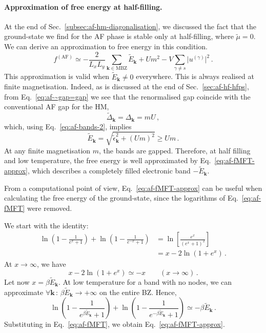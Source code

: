 \paragraph{Approximation of free energy at half-filling.}

At the end of Sec.~\ref{subsec:af-hm-diagonalisation}, we discussed the fact that the ground-state we find for the AF phase is stable only at half-filling, where $\tilde{\mu}=0$. We can derive an approximation to free energy in this condition.
\begin{equation}\label{eq:af-fMFT-approx}
	f^{(\mathrm{AF})} \simeq -\frac{2}{L_x L_y} \sum_{\mathbf{k}\in\mathrm{MBZ}} \tilde{E}_\mathbf{k} + U m^2 - V \sum_{\gamma \neq s} \big|u^{(\gamma)}\big|^2 \, .
\end{equation}
This approximation is valid when $\tilde{E}_\mathbf{k} \neq 0$ everywhere. This is always realised at finite magnetisation. Indeed, as is discussed at the end of Sec.~\ref{sec:af-hf-hfps}, from Eq.~\eqref{eq:af-~gap=gap} we see that the renormalised gap coincide with the conventional AF gap for the HM,
\[
	\tilde{\Delta}_\mathbf{k} = \Delta_\mathbf{k} = mU \, ,
\]
which, using Eq.~\eqref{eq:af-bands-2}, implies
\begin{equation}\label{eq:af-Ek>Um}
	\tilde{E}_\mathbf{k} = \sqrt{\tilde{\epsilon}_\mathbf{k}^2 + (Um)^2} \ge Um \, .
\end{equation}
At any finite magnetisation $m$, the bands are gapped. Therefore, at half filling and low temperature, the free energy is well approximated by Eq.~\eqref{eq:af-fMFT-approx}, which describes a completely filled electronic band $-\tilde{E}_\mathbf{k}$.

From a computational point of view, Eq.~\eqref{eq:af-fMFT-approx} can be useful when calculating the free energy of the ground-state, since the logarithms of Eq.~\eqref{eq:af-fMFT} were removed.

\begin{tabproof}
	
	We start with the identity:
	\[
	\begin{aligned}
		\ln(1 - \frac{1}{e^x + 1}) + \ln(1 - \frac{1}{e^{-x} + 1}) &= \ln\left[ \frac{e^x}{(e^x+1)^2} \right] \\
		&= x - 2 \ln(1+e^x) \, .
	\end{aligned}
	\]
	At $x \to \infty$, we have
	\[
	x - 2 \ln(1+e^x) \simeq -x
	\qquad
	(x \to \infty) \, .
	\]
	Let now $x=\beta \tilde{E}_\mathbf{k}$. At low temperature for a band with no nodes, we can approximate $\forall\mathbf{k}\,\colon\,\beta \tilde{E}_\mathbf{k}\to +\infty$ on the entire BZ. Hence,
	\[
	\ln(1 - \frac{1}{e^{\beta \tilde{E}_\mathbf{k}} + 1}) + \ln(1 - \frac{1}{e^{-\beta \tilde{E}_\mathbf{k}} + 1}) \simeq -\beta \tilde{E}_\mathbf{k} \, .
	\]
	Substituting in Eq.~\eqref{eq:af-fMFT}, we obtain Eq.~\eqref{eq:af-fMFT-approx}.
\end{tabproof}
